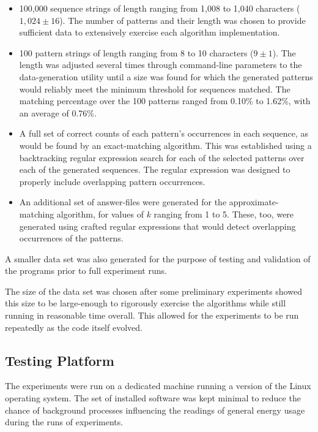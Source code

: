 \begin{itemize}
\item 100,000 sequence strings of length ranging from 1,008 to 1,040 characters ($1,024 \pm 16$). The number of patterns and their length was chosen to provide sufficient data to extensively exercise each algorithm implementation.
\item 100 pattern strings of length ranging from 8 to 10 characters ($9 \pm 1$). The length was adjusted several times through command-line parameters to the data-generation utility until a size was found for which the generated patterns would reliably meet the minimum threshold for sequences matched. The matching percentage over the 100 patterns ranged from 0.10\% to 1.62\%, with an average of 0.76\%.
\item A full set of correct counts of each pattern's occurrences in each sequence, as would be found by an exact-matching algorithm. This was established using a backtracking regular expression search for each of the selected patterns over each of the generated sequences. The regular expression was designed to properly include overlapping pattern occurrences.
\item An additional set of answer-files were generated for the approximate-matching algorithm, for values of $k$ ranging from 1 to 5. These, too, were generated using crafted regular expressions that would detect overlapping occurrences of the patterns.
\end{itemize}

A smaller data set was also generated for the purpose of testing and validation of the programs prior to full experiment runs.

The size of the data set was chosen after some preliminary experiments showed this size to be large-enough to rigorously exercise the algorithms while still running in reasonable time overall. This allowed for the experiments to be run repeatedly as the code itself evolved.

\subsection{Testing Platform}
\label{subsec:testing_platform}

The experiments were run on a dedicated machine running a version of the Linux operating system. The set of installed software was kept minimal to reduce the chance of background processes influencing the readings of general energy usage during the runs of experiments.

